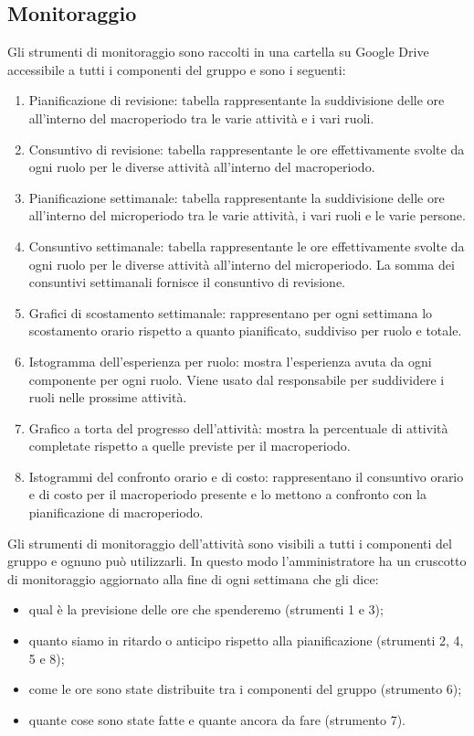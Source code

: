 \subsection{Monitoraggio}
Gli strumenti di monitoraggio sono raccolti in una cartella su Google Drive accessibile a tutti i componenti del gruppo e sono i seguenti:
\begin{enumerate}
	\item Pianificazione di revisione: tabella rappresentante la suddivisione delle ore all'interno del macroperiodo tra le varie attività e i vari ruoli.
	\item Consuntivo di revisione: tabella rappresentante le ore effettivamente svolte da ogni ruolo per le diverse attività all'interno del macroperiodo.
	\item Pianificazione settimanale: tabella rappresentante la suddivisione delle ore all'interno del microperiodo tra le varie attività, i vari ruoli e le varie persone.
	\item Consuntivo settimanale: tabella rappresentante le ore effettivamente svolte da ogni ruolo per le diverse attività all'interno del microperiodo. La somma dei consuntivi settimanali fornisce il consuntivo di revisione.
	\item Grafici di scostamento settimanale: rappresentano per ogni settimana lo scostamento orario rispetto a quanto pianificato, suddiviso per ruolo e totale.
	\item Istogramma dell'esperienza per ruolo: mostra l'esperienza avuta da ogni componente per ogni ruolo. Viene usato dal responsabile per suddividere i ruoli nelle prossime attività.
	\item Grafico a torta del progresso dell'attività: mostra la percentuale di attività completate rispetto a quelle previste per il macroperiodo.
	\item Istogrammi del confronto orario e di costo: rappresentano il consuntivo orario e di costo per il macroperiodo presente e lo mettono a confronto con la pianificazione di macroperiodo.
\end{enumerate}

\noindent Gli strumenti di monitoraggio dell'attività sono visibili a tutti i componenti del gruppo e ognuno può utilizzarli. In questo modo l'amministratore ha un cruscotto di monitoraggio aggiornato alla fine di ogni settimana che gli dice:
\begin{itemize}
	\item qual è la previsione delle ore che spenderemo (strumenti 1 e 3);
	\item quanto siamo in ritardo o anticipo rispetto alla pianificazione (strumenti 2, 4, 5 e 8);
	\item come le ore sono state distribuite tra i componenti del gruppo (strumento 6);
	\item quante cose sono state fatte e quante ancora da fare (strumento 7).
\end{itemize}


